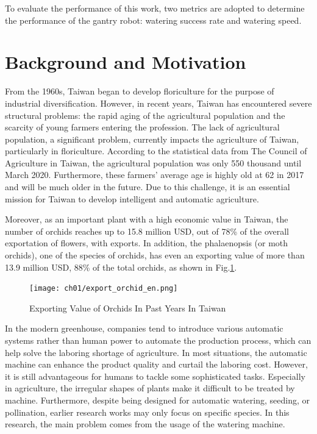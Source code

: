To evaluate the performance of this work, two metrics are adopted to determine the performance of the gantry robot: watering success rate and watering speed.


\section{Background and Motivation}
\label{section:motivation}

From the 1960s, Taiwan began to develop floriculture for the purpose of industrial diversification. However, in recent years, Taiwan has encountered severe structural problems: the rapid aging of the agricultural population and the scarcity of young farmers entering the profession. The lack of agricultural population, a significant problem, currently impacts the agriculture of Taiwan, particularly in floriculture. According to the statistical data from The Council of Agriculture in Taiwan\cite{行政院農委會_農業就業人口統計}, the agricultural population was only 550 thousand until March 2020. Furthermore, these farmers' average age is highly old at 62 in 2017\cite{黃柏軒_2018} and will be much older in the future. Due to this challenge, it is an essential mission for Taiwan to develop intelligent and automatic agriculture.

Moreover, as an important plant with a high economic value in Taiwan, the number of orchids reaches up to 15.8 million USD, out of 78\% of the overall exportation of flowers, with exports. In addition, the phalaenopsis (or moth orchids), one of the species of orchids, has even an exporting value of more than 13.9 million USD, 88\% of the total orchids, as shown in Fig.\ref{fig:export-orchid}\cite{行政院農委會_單一農產品進出口量值}.

\begin{figure}[ht]
    \centering
    \texttt{[image: ch01/export\_orchid\_en.png]}
    \caption{Exporting Value of Orchids In Past Years In Taiwan}
    \label{fig:export-orchid}
\end{figure}

In the modern greenhouse, companies tend to introduce various automatic systems rather than human power to automate the production process, which can help solve the laboring shortage of agriculture. In most situations, the automatic machine can enhance the product quality and curtail the laboring cost. However, it is still advantageous for humans to tackle some sophisticated tasks. Especially in agriculture, the irregular shapes of plants make it difficult to be treated by machine. Furthermore, despite being designed for automatic watering, seeding, or pollination, earlier research works may only focus on specific species. In this research, the main problem comes from the usage of the watering machine.

